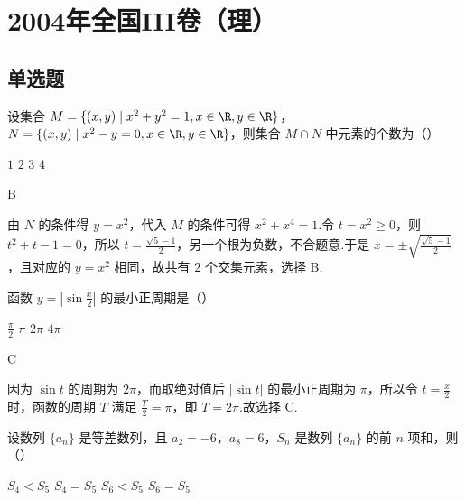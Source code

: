 \chapter{2004年全国III卷（理）}
\section{单选题}
\begin{problem}
设集合 \(M = \{(x, y)\mid x^2 + y^2 = 1, x \in \R, y \in \R\}\)，\(N = \{(x, y)\mid x^2 - y = 0, x \in \R, y \in \R\}\)，则集合 \(M \cap N\) 中元素的个数为（\quad）

\choices
    {\(1\)}
    {\(2\)}
    {\(3\)}
    {\(4\)}
\end{problem}

\begin{answer}B\end{answer}

\begin{solution}
由 \(N\) 的条件得 \(y=x^2\)，代入 \(M\) 的条件可得 \(x^2+x^4=1\).令 \(t=x^2\geqslant0\)，则 \(t^2+t-1=0\)，所以 \(t=\frac{\sqrt{5}-1}{2}\)，另一个根为负数，不合题意.于是 \(x=\pm\sqrt{\frac{\sqrt{5}-1}{2}}\)，且对应的 \(y=x^2\) 相同，故共有 \(2\) 个交集元素，选择 B.
\end{solution}

\begin{problem}
函数 \(y = \left|\sin \frac{x}{2}\right|\) 的最小正周期是（\quad）

\choices
    {\(\frac{\pi}{2}\)}
    {\(\pi\)}
    {\(2\pi\)}
    {\(4\pi\)}
\end{problem}

\begin{answer}C\end{answer}

\begin{solution}
因为 \(\sin t\) 的周期为 \(2\pi\)，而取绝对值后 \(\lvert\sin t\rvert\) 的最小正周期为 \(\pi\)，所以令 \(t=\frac{x}{2}\) 时，函数的周期 \(T\) 满足 \(\frac{T}{2}=\pi\)，即 \(T=2\pi\).故选择 C.
\end{solution}

\begin{problem}
设数列 \(\{a_{n}\}\) 是等差数列，且 \(a_{2} = -6\)，\(a_{8} = 6\)，\(S_{n}\) 是数列 \(\{a_{n}\}\) 的前 \(n\) 项和，则（\quad）

\choices
    {\(S_{4} < S_{5}\)}
    {\(S_{4} = S_{5}\)}
    {\(S_{6} < S_{5}\)}
    {\(S_{6} = S_{5}\)}
\end{problem}

